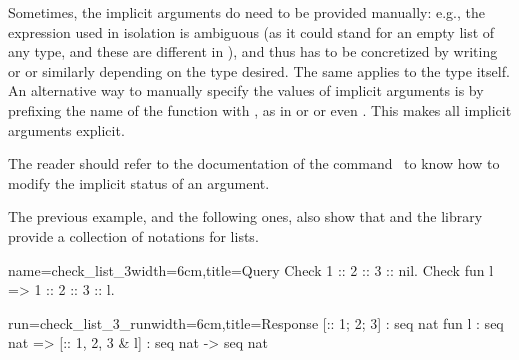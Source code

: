 Sometimes, the implicit arguments do need to be provided
manually: e.g., the expression  used in isolation
is ambiguous (as it
could stand for an empty list of any type, and these are
different in \Coq{}), and thus has to be concretized by
writing  or  or
similarly depending on the type desired.  The same applies
to the type  itself.  An alternative way to manually
specify the values of implicit arguments is by prefixing the
name of the function with , as in
 or  or even
.
This makes all implicit arguments explicit.




The reader should refer to the documentation of the 
command~\cite{Coq:manual} to know how to modify the implicit 
status of an argument. 

The previous example, and the following ones, also show
that \Coq{} and the \mcbMC{} library provide
a collection of notations for lists.

\begin{coq-left}{name=check_list_3}{width=6cm,title=Query}
Check 1 :: 2 :: 3 :: nil.
Check fun l => 1 :: 2 :: 3 :: l.
$~$
\end{coq-left}
\begin{coqout-right}{run=check_list_3_run}{width=6cm,title=Response}
[:: 1; 2; 3] : seq nat
fun l : seq nat => [:: 1, 2, 3 & l]
  : seq nat -> seq nat
\end{coqout-right}
\index[coq]{\C{[:: .. , .. & ..]}}

